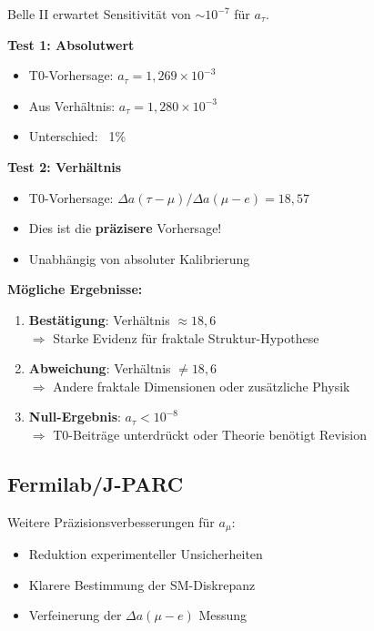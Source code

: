 	Belle II erwartet Sensitivität von $\sim 10^{-7}$ für $a_\tau$.
	
	\textbf{Test 1: Absolutwert}
	\begin{itemize}
		\item T0-Vorhersage: $a_\tau = 1{,}269 \times 10^{-3}$
		\item Aus Verhältnis: $a_\tau = 1{,}280 \times 10^{-3}$
		\item Unterschied: ~1\%
	\end{itemize}
	
	\textbf{Test 2: Verhältnis}
	\begin{itemize}
		\item T0-Vorhersage: $\Delta a(\tau - \mu) / \Delta a(\mu - e) = 18{,}57$
		\item Dies ist die \textbf{präzisere} Vorhersage!
		\item Unabhängig von absoluter Kalibrierung
	\end{itemize}
	
	\textbf{Mögliche Ergebnisse:}
	\begin{enumerate}
		\item \textbf{Bestätigung}: Verhältnis $\approx 18{,}6$ \\
		$\Rightarrow$ Starke Evidenz für fraktale Struktur-Hypothese
		
		\item \textbf{Abweichung}: Verhältnis $\neq 18{,}6$ \\
		$\Rightarrow$ Andere fraktale Dimensionen oder zusätzliche Physik
		
		\item \textbf{Null-Ergebnis}: $a_\tau < 10^{-8}$ \\
		$\Rightarrow$ T0-Beiträge unterdrückt oder Theorie benötigt Revision
	\end{enumerate}
	
	\subsection{Fermilab/J-PARC}
	
	Weitere Präzisionsverbesserungen für $a_\mu$:
	\begin{itemize}
		\item Reduktion experimenteller Unsicherheiten
		\item Klarere Bestimmung der SM-Diskrepanz
		\item Verfeinerung der $\Delta a(\mu - e)$ Messung
	\end{itemize}
	
